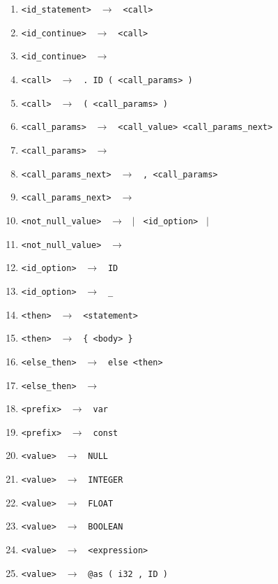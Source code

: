 \documentclass[a4paper, 11pt]{article}
\begin{document}
\begin{enumerate}
    \item \verb|<id_statement> | $\rightarrow$ \verb| <call>|
    \item \verb|<id_continue> | $\rightarrow$ \verb| <call>|
    \item \verb|<id_continue> | $\rightarrow \ \ $ \bm{$\varepsilon$}
    \item \verb|<call> | $\rightarrow$ \verb| . ID ( <call_params> )|
    \item \verb|<call> | $\rightarrow$ \verb| ( <call_params> )|
    \item \verb|<call_params> | $\rightarrow$ \verb| <call_value> <call_params_next>|
    \item \verb|<call_params> | $\rightarrow \ \ $ \bm{$\varepsilon$}
    \item \verb|<call_params_next> | $\rightarrow$ \verb| , <call_params>|
    \item \verb|<call_params_next> | $\rightarrow \ \ $ \bm{$\varepsilon$}
    \item \verb|<not_null_value> | $\rightarrow \ \ $ $|$ \verb| <id_option> | $|$
    \item \verb|<not_null_value> | $\rightarrow \ \ $ \bm{$\varepsilon$}
    \item \verb|<id_option> | $\rightarrow$ \verb| ID|
    \item \verb|<id_option> | $\rightarrow$ \verb| _|
    \item \verb|<then> | $\rightarrow$ \verb| <statement>|
    \item \verb|<then> | $\rightarrow$ \verb| { <body> }|
    \item \verb|<else_then> | $\rightarrow$ \verb| else <then>|
    \item \verb|<else_then> | $\rightarrow \ \ $ \bm{$\varepsilon$}
    \item \verb|<prefix> | $\rightarrow$ \verb| var|
    \item \verb|<prefix> | $\rightarrow$ \verb| const|
    \item \verb|<value> | $\rightarrow$ \verb| NULL|
    \item \verb|<value> | $\rightarrow$ \verb| INTEGER|
    \item \verb|<value> | $\rightarrow$ \verb| FLOAT|
    \item \verb|<value> | $\rightarrow$ \verb| BOOLEAN|
    \item \verb|<value> | $\rightarrow$ \verb| <expression>|
    \item \verb|<value> | $\rightarrow$ \verb| @as ( i32 , ID )|

\end{enumerate}
\end{document}
